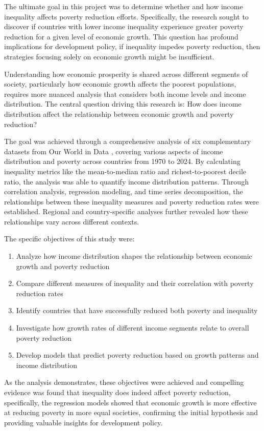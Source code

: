 \documentclass[12pt,a4paper]{article}
\begin{document}
The ultimate goal in this project was to determine whether and how income inequality affects poverty reduction efforts. Specifically, the research sought to discover if countries with lower income inequality experience greater poverty reduction for a given level of economic growth. This question has profound implications for development policy, if inequality impedes poverty reduction, then strategies focusing solely on economic growth might be insufficient.

Understanding how economic prosperity is shared across different segments of society, particularly how economic growth affects the poorest populations, requires more nuanced analysis that considers both income levels and income distribution. The central question driving this research is: How does income distribution affect the relationship between economic growth and poverty reduction?

The goal was achieved through a comprehensive analysis of six complementary datasets from Our World in Data \cite{hasell2022poverty}, covering various aspects of income distribution and poverty across countries from 1970 to 2024. By calculating inequality metrics like the mean-to-median ratio and richest-to-poorest decile ratio, the analysis was able to quantify income distribution patterns. Through correlation analysis, regression modeling, and time series decomposition, the relationships between these inequality measures and poverty reduction rates were established. Regional and country-specific analyses further revealed how these relationships vary across different contexts.

The specific objectives of this study were:
\begin{enumerate}
    \item Analyze how income distribution shapes the relationship between economic growth and poverty reduction
    \item Compare different measures of inequality and their correlation with poverty reduction rates
    \item Identify countries that have successfully reduced both poverty and inequality
    \item Investigate how growth rates of different income segments relate to overall poverty reduction
    \item Develop models that predict poverty reduction based on growth patterns and income distribution
\end{enumerate}

As the analysis demonstrates, these objectives were achieved and compelling evidence was found that inequality does indeed affect poverty reduction, specifically, the regression models showed that economic growth is more effective at reducing poverty in more equal societies, confirming the initial hypothesis and providing valuable insights for development policy.
\end{document}
